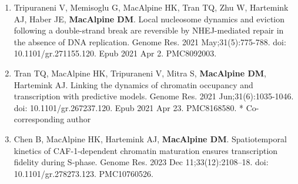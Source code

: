 \begin{statement}
\begin{enumerate}
\item Tripuraneni V, Memisoglu G, MacAlpine HK, Tran TQ, Zhu W, Hartemink AJ, Haber JE, \textbf{MacAlpine DM}. Local nucleosome dynamics and eviction following a double-strand break are reversible by NHEJ-mediated repair in the absence of DNA replication. Genome Res. 2021 May;31(5):775-788. doi: 10.1101/gr.271155.120. Epub 2021 Apr 2. PMC8092003.

\item Tran TQ, MacAlpine HK, Tripuraneni V, Mitra S, \textbf{MacAlpine DM}, Hartemink AJ. Linking the dynamics of chromatin occupancy and transcription with predictive models. Genome Res. 2021 Jun;31(6):1035-1046. doi: 10.1101/gr.267237.120. Epub 2021 Apr 23. PMC8168580. * Co-corresponding author


\item Chen B, MacAlpine HK, Hartemink AJ, \textbf{MacAlpine DM}. Spatiotemporal kinetics of CAF-1-dependent chromatin maturation ensures transcription fidelity during S-phase. Genome Res. 2023 Dec 11;33(12):2108–18. doi: 10.1101/gr.278273.123. PMC10760526.
\end{enumerate}

\end{statement}
